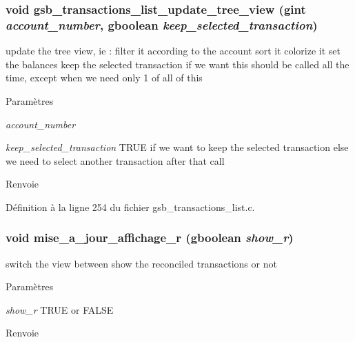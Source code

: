 \subsubsection[{gsb\_\-transactions\_\-list\_\-update\_\-tree\_\-view}]{\setlength{\rightskip}{0pt plus 5cm}void gsb\_\-transactions\_\-list\_\-update\_\-tree\_\-view (gint {\em account\_\-number}, \/  gboolean {\em keep\_\-selected\_\-transaction})}\label{gsb__transactions__list_8c_ab7d08f59bcf7149edda9db47e67333a4}
update the tree view, ie : filter it according to the account sort it colorize it set the balances keep the selected transaction if we want this should be called all the time, except when we need only 1 of all of this


\begin{DoxyParams}{Paramètres}
\item[{\em account\_\-number}]\item[{\em keep\_\-selected\_\-transaction}]TRUE if we want to keep the selected transaction else we need to select another transaction after that call\end{DoxyParams}
\begin{DoxyReturn}{Renvoie}

\end{DoxyReturn}


Définition à la ligne 254 du fichier gsb\_\-transactions\_\-list.c.

\subsubsection[{mise\_\-a\_\-jour\_\-affichage\_\-r}]{\setlength{\rightskip}{0pt plus 5cm}void mise\_\-a\_\-jour\_\-affichage\_\-r (gboolean {\em show\_\-r})}\label{gsb__transactions__list_8c_a7885778abe9c7b1213f7f0485e666413}
switch the view between show the reconciled transactions or not


\begin{DoxyParams}{Paramètres}
\item[{\em show\_\-r}]TRUE or FALSE\end{DoxyParams}
\begin{DoxyReturn}{Renvoie}

\end{DoxyReturn}


